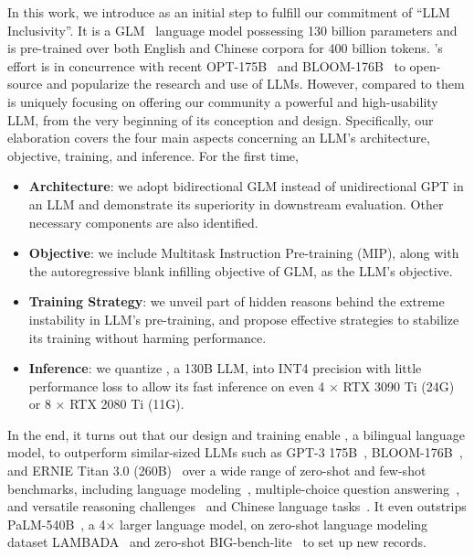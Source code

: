 {In this work, we introduce \glm as an initial step to fulfill our commitment of ``LLM Inclusivity''.
It is a GLM~\citep{du2022glm} language model possessing 130 billion parameters and is pre-trained over both English and Chinese corpora for 400 billion tokens.
\glm's effort is in concurrence with recent OPT-175B~\citep{zhang2022opt} and BLOOM-176B~\citep{scao2022what} to open-source and popularize the research and use of LLMs.
However, compared to them \glm is uniquely focusing on offering our community a powerful and high-usability LLM, from the very beginning of its conception and design.
Specifically, our elaboration covers the four main aspects concerning an LLM's architecture, objective, training, and inference. For the first time, 
\begin{itemize}[leftmargin=*,itemsep=0pt,parsep=0.2em,topsep=0.0em,partopsep=0.0em]
    \item \textbf{Architecture}: we adopt bidirectional GLM instead of unidirectional GPT in an LLM and demonstrate its superiority in downstream evaluation. Other necessary components are also identified.
    \item \textbf{Objective}: we include Multitask Instruction Pre-training (MIP), along with the autoregressive blank infilling objective of GLM, as the LLM's objective.
    \item \textbf{Training Strategy}: we unveil part of hidden reasons behind the extreme instability in LLM's pre-training, and propose effective strategies to stabilize its training without harming performance.
    \item \textbf{Inference}: we quantize \glm, a 130B LLM, into INT4 precision with little performance loss to allow its fast inference on even 4 $\times$ RTX 3090 Ti (24G) or 8 $\times$ RTX 2080 Ti (11G).
\end{itemize}

In the end, it turns out that our design and training enable \glm, a bilingual language model, to outperform similar-sized LLMs such as GPT-3 175B~\citep{brown2020language}, BLOOM-176B~\citep{scao2022what}, and ERNIE Titan 3.0 (260B)~\citep{wang2021ernie} over a wide range of zero-shot and few-shot benchmarks, including language modeling~\citep{paperno2016lambada,marcinkiewicz1994building}, multiple-choice question answering~\citep{hendrycks2021measuring}, and versatile reasoning challenges~\citep{srivastava2022beyond} and Chinese language tasks~\citep{xu2020clue,xu2021fewclue}.
It even outstrips PaLM-540B~\citep{chowdhery2022palm}, a 4$\times$ larger language model, on zero-shot language modeling dataset LAMBADA~\citep{paperno2016lambada} and zero-shot BIG-bench-lite~\citep{srivastava2022beyond} to set up new records.

}
